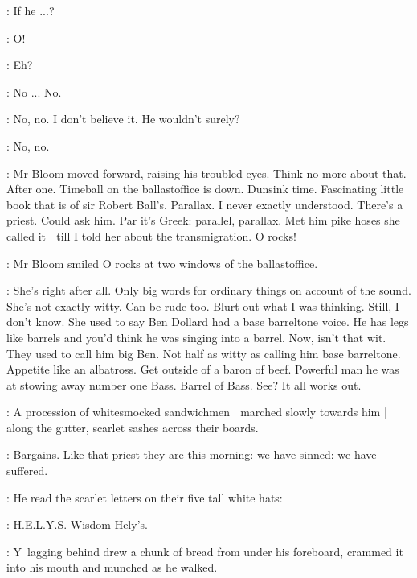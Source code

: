 \BloomInt:
If he ...?

\BloomInt:
O!

\BloomInt:
Eh?

\BloomInt:
No ...
No.

\BloomInt:
No, no.
I don't believe it.
He wouldn't surely?

\BloomInt:
No, no.

:
Mr Bloom moved forward, raising his troubled eyes.
Think no more about that.
After one.
Timeball on the ballastoffice is down.
Dunsink time.
Fascinating little book that is of sir Robert Ball's.
Parallax.
I never exactly understood.
There's a priest.
Could ask him.
Par it's Greek:
parallel, parallax.
Met him pike hoses she called it |
till I told her about the transmigration.
O rocks!

:
Mr Bloom smiled O rocks at two windows of the ballastoffice.

\BloomInt:
She's right after all.
Only big words for ordinary things on account of the sound.
She's not exactly witty.
Can be rude too.
Blurt out what I was thinking.
Still, I don't know.
She used to say Ben Dollard had a base barreltone voice.
He has legs like barrels and you'd think he was singing into a barrel.
Now, isn't that wit.
They used to call him big Ben.
Not half as witty as calling him base barreltone.
Appetite like an albatross.
Get outside of a baron of beef.
Powerful man he was at stowing away number one Bass.
Barrel of Bass.
See?
It all works out.

:
A procession of whitesmocked sandwichmen |
marched slowly towards him |
along the gutter,
scarlet sashes across their boards.

\BloomInt:
Bargains.
Like that priest they are this morning:
we have sinned:
we have suffered.

:
He read the scarlet letters on their five tall white hats:

\BloomInt:
H.E.L.Y.S.
Wisdom Hely's.

:
Y~lagging behind
drew a chunk of bread from under his foreboard,
crammed it into his mouth
and munched as he walked.

